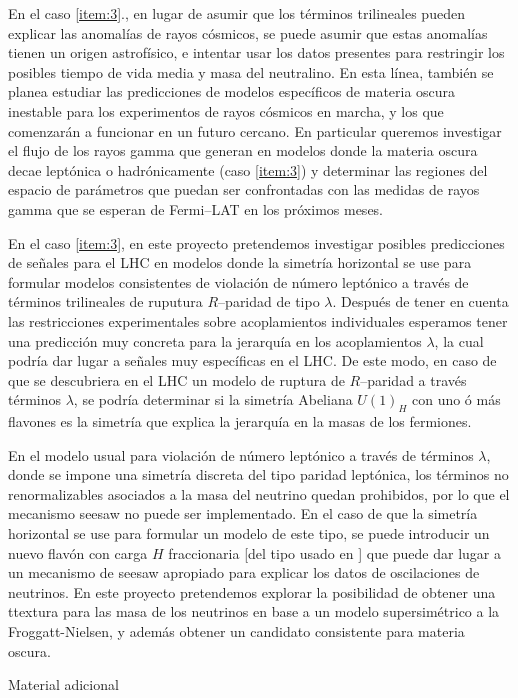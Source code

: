 En el caso \ref{item:3}., en lugar de asumir que los términos trilineales pueden explicar las anomalías de rayos cósmicos, se puede asumir que estas anomalías tienen un origen astrofísico, e intentar usar los datos presentes para restringir los posibles tiempo de vida media y masa del neutralino. En esta línea, también se planea estudiar las predicciones de modelos específicos de materia oscura inestable para los experimentos de rayos cósmicos en marcha, y los que comenzarán a funcionar en un futuro cercano. En particular queremos  investigar el flujo de los rayos gamma que generan en modelos donde la materia oscura decae leptónica o hadrónicamente (caso \ref{item:3}) y determinar las regiones del espacio de parámetros que puedan ser confrontadas con las medidas de rayos gamma que se esperan de Fermi--LAT en los próximos meses.

En el caso \ref{item:3}, en este proyecto pretendemos investigar posibles predicciones de señales para el LHC en modelos donde la simetría horizontal se use para formular modelos consistentes de violación de número leptónico a través de términos trilineales de ruputura $R$--paridad de tipo $\lambda$. Después de tener en cuenta las restricciones experimentales sobre acoplamientos individuales
esperamos tener una predicción muy concreta para la jerarquía en los acoplamientos $\lambda$, la cual podría dar lugar a señales muy específicas en el LHC. De este modo, en caso de que se descubriera en el LHC un modelo de ruptura de $R$--paridad a través términos $\lambda$, se podría determinar si la simetría Abeliana  $U(1)_H$ con uno ó más flavones es la simetría que explica la jerarquía en la masas de los fermiones.

En el modelo usual para violación de número leptónico a través de términos $\lambda$, donde se impone una simetría discreta del tipo paridad leptónica, los términos no renormalizables asociados a la masa del neutrino quedan prohibidos, por lo que el mecanismo seesaw no puede ser implementado. En el caso de que la simetría horizontal se use para formular un modelo de este tipo, se puede introducir un nuevo flavón con carga $H$ fraccionaria [del tipo usado en \cite{Chen:2008tc}] que puede dar lugar a un mecanismo de seesaw apropiado para explicar los datos de oscilaciones de neutrinos. En este proyecto pretendemos explorar la posibilidad de obtener una ttextura para las masa de los neutrinos en base a un modelo supersimétrico a la Froggatt-Nielsen, y además obtener un candidato consistente para materia oscura.

\begin{ideas}
  Material adicional
\end{ideas}



